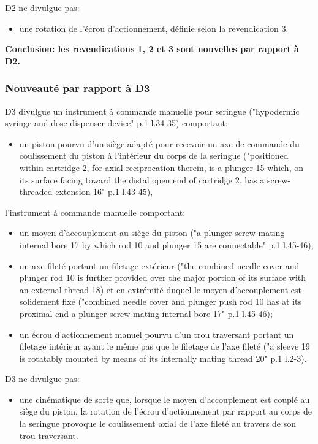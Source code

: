 D2 ne divulgue pas:
\begin{itemize}
  \item une rotation de l'écrou d'actionnement, définie selon la revendication 3.\\
\end{itemize}

\textbf{Conclusion: les revendications 1, 2 et 3 sont nouvelles par rapport à D2.}\newpage

\subsubsection{Nouveauté par rapport à D3}

D3 divulgue un instrument à commande manuelle pour seringue ("hypodermic syringe
and dose-dispenser device" p.1 l.34-35) comportant:
\begin{itemize}
  \item un piston pourvu d'un siège adapté pour recevoir un axe de commande du coulissement
  du piston à l'intérieur du corps de la seringue ("positioned within cartridge 2, for
  axial reciprocation therein, is a plunger 15 which, on its surface
  facing toward the distal open end of cartridge 2, has a screw-threaded extension 16" 
  p.1 l.43-45),
\end{itemize}
l'instrument à commande manuelle comportant:
\begin{itemize}
  \item un moyen d'accouplement au siège du piston ("a plunger screw-mating internal bore 17 by which rod
  10 and plunger 15 are connectable" p.1 l.45-46);
  \item un axe fileté portant un filetage extérieur ("the combined needle cover and plunger rod 10 is
  further provided over the major portion of its surface with an external thread 18)
   et en extrémité duquel le moyen d'accouplement est solidement fixé ("combined needle cover and plunger
  push rod 10 has at its proximal end a plunger screw-mating internal bore 17" p.1 l.45-46);
  \item un écrou d'actionnement manuel pourvu d'un trou traversant portant un filetage
  intérieur ayant le même pas que le filetage de l'axe fileté ("a sleeve 19 is rotatably mounted
  by means of its internally mating thread 20" p.1 l.2-3).\\
\end{itemize}

D3 ne divulgue pas:
\begin{itemize}
  \item une cinématique de sorte que, lorsque le moyen d'accouplement est couplé au siège du piston,
  la rotation de l'écrou d'actionnement par rapport au corps de la seringue provoque le coulissement axial
  de l'axe fileté au travers de son trou traversant.\\
\end{itemize}

